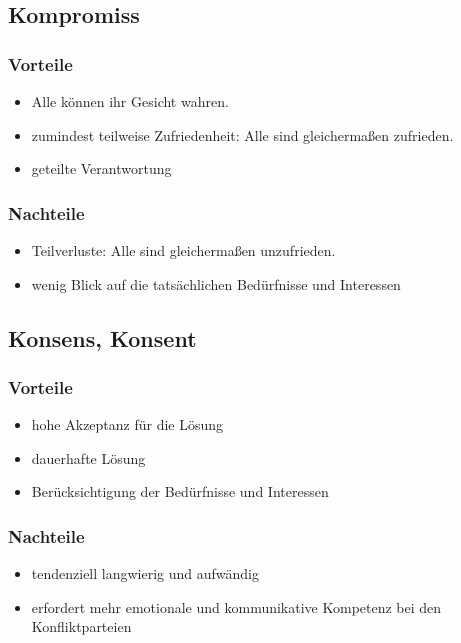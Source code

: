 \subsection{Kompromiss}

\subsubsection{Vorteile}
\begin{itemize}
  \item Alle können ihr Gesicht wahren.
  \item zumindest teilweise Zufriedenheit: Alle sind gleichermaßen zufrieden.
  \item geteilte Verantwortung
\end{itemize}

\subsubsection{Nachteile}
\begin{itemize}
  \item Teilverluste: Alle sind gleichermaßen unzufrieden.
  \item wenig Blick auf die tatsächlichen Bedürfnisse und Interessen
\end{itemize}


\subsection{Konsens, Konsent}

\subsubsection{Vorteile}
\begin{itemize}
  \item hohe Akzeptanz für die Lösung
  \item dauerhafte Lösung
  \item Berücksichtigung der Bedürfnisse und Interessen
\end{itemize}

\subsubsection{Nachteile}
\begin{itemize}
  \item tendenziell langwierig und aufwändig
  \item erfordert mehr emotionale und kommunikative Kompetenz bei den Konfliktparteien
\end{itemize}
